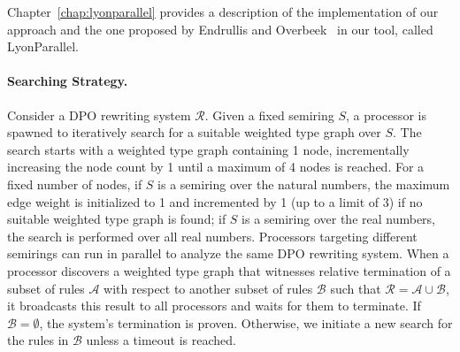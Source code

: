Chapter~\ref{chap:lyonparallel} provides a description of the implementation of our approach and the one proposed by Endrullis and Overbeek~\cite{endrullis2024generalized_arxiv_v2} in our tool, called LyonParallel.

\paragraph{Searching Strategy.}
Consider a DPO rewriting system $\mathcal{R}$. Given a fixed semiring $S$, a processor is spawned to iteratively search for a suitable weighted type graph over $S$.
The search starts with a weighted type graph containing 1 node, incrementally increasing the node count by 1 until a maximum of 4 nodes is reached.
For a fixed number of nodes,
 if $S$ is a semiring over the natural numbers, the maximum edge weight is initialized to 1 and incremented by 1 (up to a limit of 3) if no suitable weighted type graph is found;
if $S$ is a semiring over the real numbers, the search is performed over all real numbers.
Processors targeting different semirings can run in parallel to analyze the same DPO rewriting system.
When a processor discovers a weighted type graph that witnesses relative termination of a subset of rules $\mathcal{A}$ with respect to another subset of rules $\mathcal{B}$ such that $\mathcal{R} = \mathcal{A} \cup \mathcal{B}$, it broadcasts this result to all processors and waits for them to terminate. If $\mathcal{B} = \emptyset$, the system's termination is proven. Otherwise, we initiate a new search for the rules in $\mathcal{B}$ unless a timeout is reached.
 
